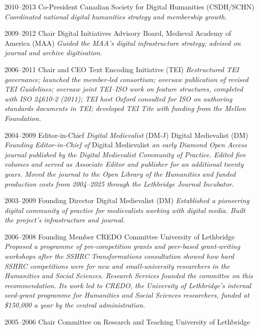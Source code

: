 \documentclass[11pt,letterpaper,sans]{moderncv}
\begin{document}
{\cventry
  {2010--2013}
  {Co-President}
  {Canadian Society for Digital Humanities (CSDH/SCHN)}
  {}
  {}
  {\textit{Coordinated national digital humanities strategy and membership growth.}}

\cventry
  {2009--2012}
  {Chair}
  {Digital Initiatives Advisory Board, Medieval Academy of America (MAA)}
  {}
  {}
  {\textit{Guided the MAA’s digital infrastructure strategy; advised on journal and archive digitisation.}}

\cventry
  {2006--2011}
  {Chair and CEO}
  {Text Encoding Initiative (TEI)}
  {}
  {}
  {\textit{Restructured TEI governance; launched the member-led consortium; oversaw publication of revised TEI Guidelines; oversaw joint TEI--ISO work on feature structures, completed with ISO 24610-2 (2011); TEI host Oxford consulted for ISO on authoring standards documents in TEI; developed TEI Tite with funding from the Mellon Foundation.}}

\cventry
  {2004--2009}
  {Editor-in-Chief}
  {\textit{Digital Medievalist} (DM-J)}
  {Digital Medievalist (DM)}
  {}
  {\textit{Founding Editor-in-Chief of} Digital Medievalist \textit{an early Diamond Open Access journal published by the Digital Medievalist Community of Practice. Edited five volumes and served as Associate Editor and publisher for an additional twenty years. Moved the journal to the Open Library of the Humanities and funded production costs from 2004--2025 through the Lethbridge Journal Incubator.}}

\cventry
  {2003--2009}
  {Founding Director}
  {Digital Medievalist (DM)}
  {}
  {}
  {\textit{Established a pioneering digital community of practice for medievalists working with digital media. Built the project’s infrastructure and journal.}}

\cventry
  {2006--2008}
  {Founding Member}
  {CREDO Committee}
  {University of Lethbridge}
  {}
  {\textit{Proposed a programme of pre-competition grants and peer-based grant-writing workshops after the SSHRC Transformations consultation showed how hard SSHRC competitions were for new and small-university researchers in the Humanities and Social Sciences. Research Services founded the committee on this recommendation. Its work led to CREDO, the University of Lethbridge’s internal seed-grant programme for Humanities and Social Sciences researchers, funded at \$150,000 a year by the central administration.}}

\cventry
  {2005--2006}
  {Chair}
  {Committee on Research and Teaching}
  {University of Lethbridge}
  {}
  {}

}
\end{document}
